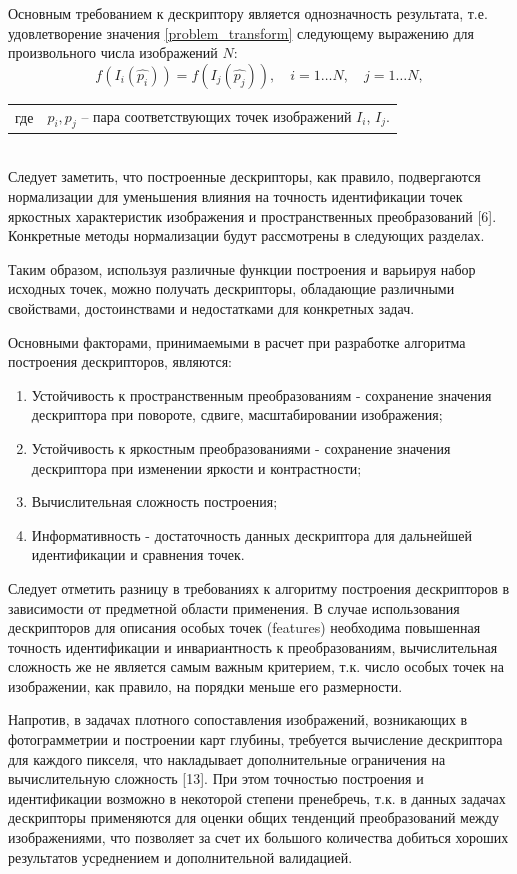 {{	Основным требованием к дескриптору является однозначность результата, т.е. удовлетворение значения \eqref{problem_transform}  следующему выражению для произвольного числа изображений $N$:
	\begin{equation}\label{problem_constraints}
	f(I_i(\hat{p_i})) = f(I_j(\hat{p_j})), \quad i=1 \hdots N, \quad j=1 \hdots N,
	\end{equation} 
	\begin{tabular}{ rl }
	\quad \quad где 
	& $p_i, p_j$ -- пара соответствующих точек изображений $I_i$, $I_j$.
	\end{tabular}\\

	Следует заметить, что построенные дескрипторы, как правило, подвергаются нормализации для уменьшения влияния на точность идентификации точек яркостных характеристик изображения и пространственных преобразований [6]. Конкретные методы нормализации будут рассмотрены в следующих разделах. 
	
	Таким образом, используя различные функции построения и варьируя набор исходных точек, можно получать дескрипторы, обладающие различными свойствами, достоинствами и недостатками для конкретных задач. 
	
	Основными факторами, принимаемыми в расчет при разработке алгоритма построения дескрипторов, являются:
	\begin{enumerate}
	   	\item Устойчивость к пространственным преобразованиям - сохранение значения дескриптора при повороте, сдвиге, масштабировании изображения;
	   	\item Устойчивость к яркостным преобразованиями - сохранение значения дескриптора при изменении яркости и контрастности;
	   	\item Вычислительная сложность построения;
	   	\item Информативность - достаточность данных дескриптора для дальнейшей идентификации и сравнения точек.
	\end{enumerate} 
	
	Следует отметить разницу в требованиях к алгоритму построения дескрипторов в зависимости от предметной области применения. В случае использования дескрипторов для описания особых точек (features) необходима повышенная точность идентификации и инвариантность к преобразованиям, вычислительная сложность же не является самым важным критерием, т.к. число особых точек на изображении, как правило, на порядки меньше его размерности. 
	
	Напротив, в задачах плотного сопоставления изображений, возникающих в фотограмметрии и построении карт глубины, требуется вычисление дескриптора для каждого пикселя, что накладывает дополнительные ограничения на вычислительную сложность [13]. При этом точностью построения и идентификации возможно в некоторой степени пренебречь, т.к. в данных задачах дескрипторы применяются для оценки общих тенденций преобразований между изображениями, что позволяет за счет их большого количества добиться хороших результатов усреднением и дополнительной валидацией.
	
}}
